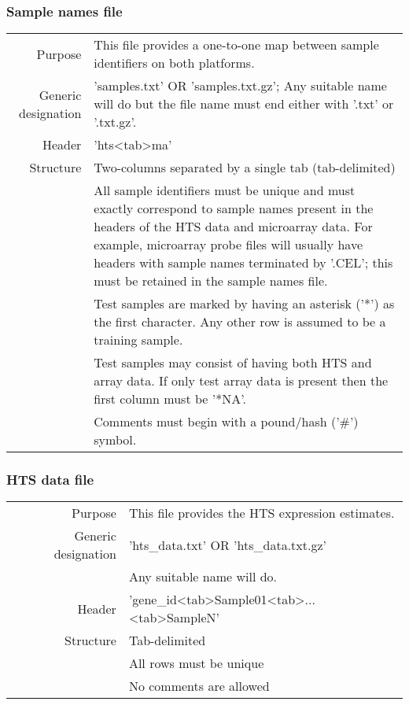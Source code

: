 \documentclass[a4paper,12pt]{article}
\begin{document}
\subsubsection{Sample names file}

\begin{tabular}{rp{12cm}}
Purpose & This file provides a one-to-one map between sample identifiers on both platforms. \\
Generic designation & 'samples.txt' OR 'samples.txt.gz'; Any suitable name will do but the file name must end either with '.txt' or '.txt.gz'. \\
Header & 'hts\textless tab\textgreater ma' \\
Structure & Two-columns separated by a single tab (tab-delimited) \\
  & All sample identifiers must be unique and must exactly correspond to sample names present in the headers of the HTS data and microarray data. For example, microarray probe files will usually have headers with sample names terminated by '.CEL'; this must be retained in the sample names file. \\
  & Test samples are marked by having an asterisk ('*') as the first character. Any other row is assumed to be a training sample. \\
  & Test samples may consist of having both HTS and array data. If only test array data is present then the first column must be '*NA'. \\
  & Comments must begin with a pound/hash ('\#') symbol. \\
\end{tabular}

\subsubsection{HTS data file}

\begin{tabular}{rp{12cm}}
Purpose & This file provides the HTS expression estimates.\\
Generic designation & 'hts\_data.txt' OR 'hts\_data.txt.gz' \\
  & Any suitable name will do. \\
Header & 'gene\_id\textless tab\textgreater Sample01\textless tab\textgreater...\textless tab\textgreater SampleN' \\
Structure & Tab-delimited \\
  & All rows must be unique \\
  & No comments are allowed \\
\end{tabular}
\end{document}
